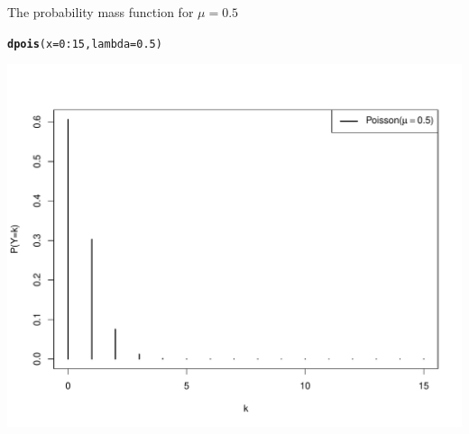 \documentclass{beamer}\usepackage[]{graphicx}\usepackage[]{color}
\newcommand{\hlnum}[1]{\textcolor[rgb]{0.686,0.059,0.569}{#1}}%
\newcommand{\hlopt}[1]{\textcolor[rgb]{0,0,0}{#1}}%
\newcommand{\hlstd}[1]{\textcolor[rgb]{0.345,0.345,0.345}{#1}}%
\newcommand{\hlkwc}[1]{\textcolor[rgb]{0.333,0.667,0.333}{#1}}%
\newcommand{\hlkwd}[1]{\textcolor[rgb]{0.737,0.353,0.396}{\textbf{#1}}}%
\newenvironment{knitrout}{}{} %
\begin{document}
\begin{frame}[fragile]{The probability mass function for $\mu=0.5$}

\begin{knitrout}\scriptsize
{}\color{fgcolor}
\begin{alltt}
\hlkwd{dpois}\hlstd{(}\hlkwc{x} \hlstd{=} \hlnum{0}\hlopt{:}\hlnum{15}\hlstd{,} \hlkwc{lambda} \hlstd{=} \hlnum{0.5}\hlstd{)}
\end{alltt}

\end{knitrout}

\vspace*{-0.5in}

\begin{knitrout}\scriptsize
{}\color{fgcolor}

{\centering \includegraphics[width=1\linewidth]{figure/unnamed-chunk-3-1} 

}



\end{knitrout}

\end{frame}
\end{document}
